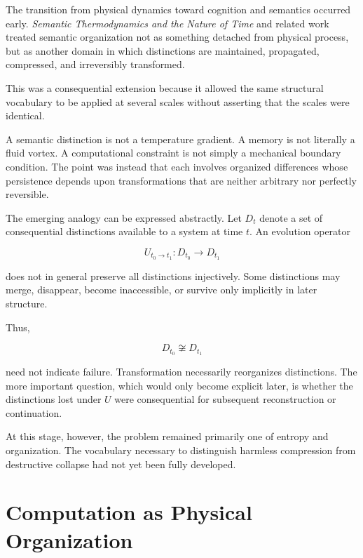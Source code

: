 \documentclass[11pt]{article}
\theoremstyle{remark}
\begin{document}
The transition from physical dynamics toward cognition and semantics occurred early. \emph{Semantic Thermodynamics and the Nature of Time} and related work treated semantic organization not as something detached from physical process, but as another domain in which distinctions are maintained, propagated, compressed, and irreversibly transformed.

This was a consequential extension because it allowed the same structural vocabulary to be applied at several scales without asserting that the scales were identical.

A semantic distinction is not a temperature gradient. A memory is not literally a fluid vortex. A computational constraint is not simply a mechanical boundary condition. The point was instead that each involves organized differences whose persistence depends upon transformations that are neither arbitrary nor perfectly reversible.

The emerging analogy can be expressed abstractly. Let $D_t$ denote a set of consequential distinctions available to a system at time $t$. An evolution operator

\begin{equation}
U_{t_0\rightarrow t_1}
:
D_{t_0}
\rightarrow
D_{t_1}
\end{equation}

does not in general preserve all distinctions injectively. Some distinctions may merge, disappear, become inaccessible, or survive only implicitly in later structure.

Thus,

\begin{equation}
D_{t_0}
\not\cong
D_{t_1}
\end{equation}

need not indicate failure. Transformation necessarily reorganizes distinctions. The more important question, which would only become explicit later, is whether the distinctions lost under $U$ were consequential for subsequent reconstruction or continuation.

At this stage, however, the problem remained primarily one of entropy and organization. The vocabulary necessary to distinguish harmless compression from destructive collapse had not yet been fully developed.

\section{Computation as Physical Organization}
\end{document}
